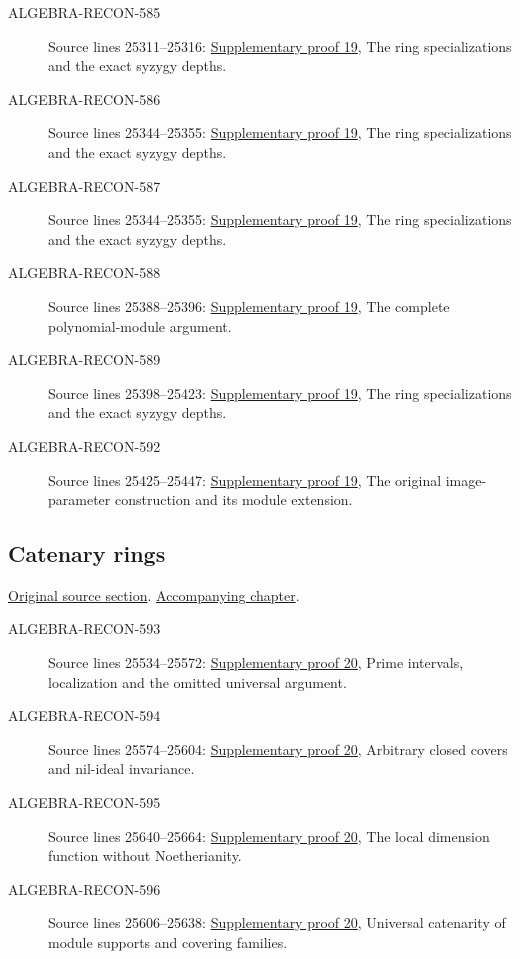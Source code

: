 \begin{description}
\item[ALGEBRA-RECON-585] Source lines 25311--25316: \hyperlink{algebra_cm_modules_notes_20260928}{Supplementary proof 19}, The ring specializations and the exact syzygy depths.
\item[ALGEBRA-RECON-586] Source lines 25344--25355: \hyperlink{algebra_cm_modules_notes_20260928}{Supplementary proof 19}, The ring specializations and the exact syzygy depths.
\item[ALGEBRA-RECON-587] Source lines 25344--25355: \hyperlink{algebra_cm_modules_notes_20260928}{Supplementary proof 19}, The ring specializations and the exact syzygy depths.
\item[ALGEBRA-RECON-588] Source lines 25388--25396: \hyperlink{algebra_cm_modules_notes_20260928}{Supplementary proof 19}, The complete polynomial-module argument.
\item[ALGEBRA-RECON-589] Source lines 25398--25423: \hyperlink{algebra_cm_modules_notes_20260928}{Supplementary proof 19}, The ring specializations and the exact syzygy depths.
\item[ALGEBRA-RECON-592] Source lines 25425--25447: \hyperlink{algebra_cm_modules_notes_20260928}{Supplementary proof 19}, The original image-parameter construction and its module extension.
\end{description}

\subsection{Catenary rings}
\hypertarget{algebra-source-section-catenary}{}
\noindent\href{https://github.com/stacks/stacks-project/blob/a04446e57ec1fbc252a871afcec7752fb2807b14/algebra.tex\#L25456}{Original source section}. \href{algebra.pdf\#nameddest=section-catenary}{Accompanying chapter}.

\begin{description}
\item[ALGEBRA-RECON-593] Source lines 25534--25572: \hyperlink{algebra_catenary_regular_notes_20260928}{Supplementary proof 20}, Prime intervals, localization and the omitted universal argument.
\item[ALGEBRA-RECON-594] Source lines 25574--25604: \hyperlink{algebra_catenary_regular_notes_20260928}{Supplementary proof 20}, Arbitrary closed covers and nil-ideal invariance.
\item[ALGEBRA-RECON-595] Source lines 25640--25664: \hyperlink{algebra_catenary_regular_notes_20260928}{Supplementary proof 20}, The local dimension function without Noetherianity.
\item[ALGEBRA-RECON-596] Source lines 25606--25638: \hyperlink{algebra_catenary_regular_notes_20260928}{Supplementary proof 20}, Universal catenarity of module supports and covering families.
\end{description}

